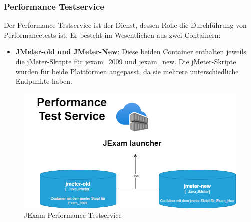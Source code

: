 \subsubsection{Performance Testservice}

Der Performance Testservice ist der Dienst, dessen Rolle die
Durchführung von Performancetests ist. Er besteht im Wesentlichen
aus zwei Containern:

\begin{itemize}
    \setlength\itemsep{1em}

    \item[] \textbf{JMeter-old und JMeter-New}: Diese beiden Container enthalten jeweils
    die jMeter-Skripte für \Gls{jexam_2009} und \Gls{jexam_new}. Die
    jMeter-Skripte wurden für beide Plattformen angepasst, da sie
    mehrere unterschiedliche Endpunkte haben.

\end{itemize}

\begin{figure}[H]
    \centering
    \includegraphics[scale=0.6]{images/performance.drawio}
    \caption{JExam Performance Testservice} \label{fig:per}
\end{figure}